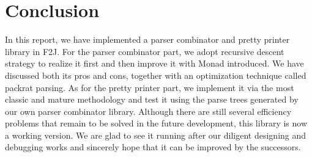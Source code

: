 \chapter{Conclusion}
In this report, we have implemented a parser combinator and pretty printer library in F2J. For the parser combinator part, we adopt recursive descent strategy to realize it first and then improve it with Monad introduced. We have discussed both its pros and cons, together with an optimization technique called packrat parsing. As for the pretty printer part, we implement it via the most classic and mature methodology and test it using the parse trees generated by our own parser combinator library. Although there are still several efficiency problems that remain to be solved in the future development, this library is now a working version. We are glad to see it running after our diligent designing and debugging works and sincerely hope that it can be improved by the successors.
